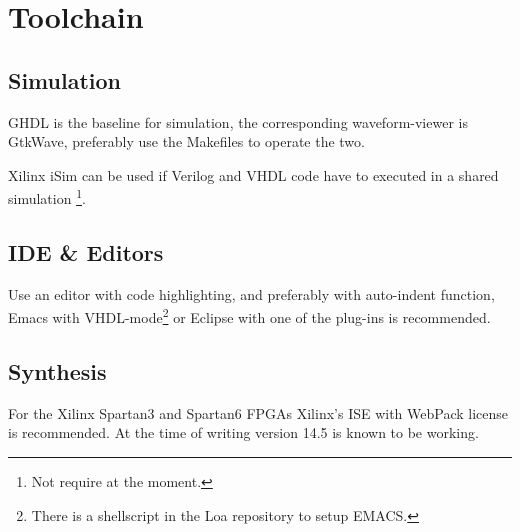 \chapter{Toolchain}

\section{Simulation}
GHDL is the baseline for simulation, the corresponding waveform-viewer is GtkWave, preferably use the Makefiles to operate the two.

Xilinx iSim can be used if Verilog and VHDL code have to executed in a shared simulation \footnote{Not require at the moment.}.

\section{IDE \& Editors}
Use an editor with code highlighting, and preferably with auto-indent function, Emacs with VHDL-mode\footnote{There is a shellscript in the Loa repository to setup EMACS.} or Eclipse with one of the plug-ins is recommended.

\section{Synthesis}
For the Xilinx Spartan3 and Spartan6 FPGAs Xilinx's ISE with WebPack license is recommended. At the time of writing version 14.5 is known to be working.



